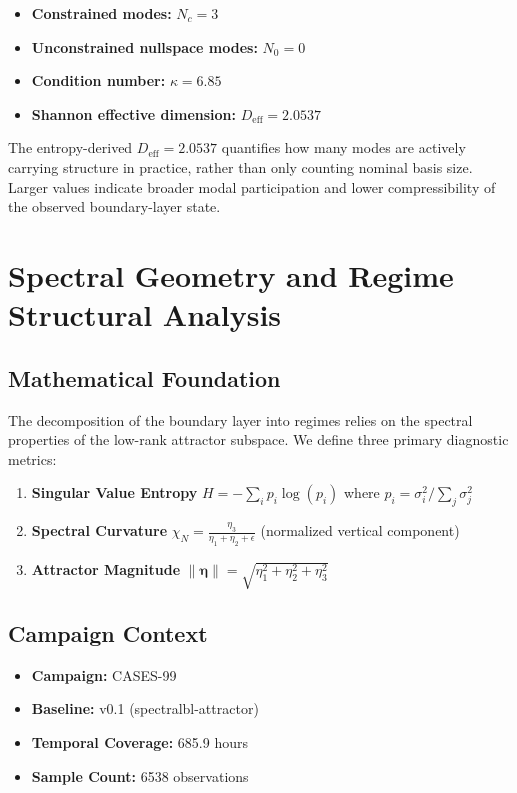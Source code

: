 \documentclass[11pt,a4paper]{article}
\begin{document}
\begin{itemize}
    \item \textbf{Constrained modes:} $N_c = 3$
    \item \textbf{Unconstrained nullspace modes:} $N_0 = 0$
    \item \textbf{Condition number:} $\kappa = 6.85$
    \item \textbf{Shannon effective dimension:} $D_{\text{eff}} = 2.0537$
\end{itemize}

The entropy-derived $D_{\text{eff}} = 2.0537$ quantifies how many modes are actively carrying structure in practice, rather than only counting nominal basis size. Larger values indicate broader modal participation and lower compressibility of the observed boundary-layer state.

\label{sec:attractor_CASES-99} 
\newpage



\section{Spectral Geometry and Regime Structural Analysis}

\subsection{Mathematical Foundation}

The decomposition of the boundary layer into regimes relies on the spectral properties of the low-rank attractor subspace. We define three primary diagnostic metrics:

\begin{enumerate}
    \item \textbf{Singular Value Entropy} $H = -\sum_i p_i \log(p_i)$ where $p_i = \sigma_i^2 / \sum_j \sigma_j^2$
    \item \textbf{Spectral Curvature} $\chi_N = \frac{\eta_3}{\eta_1 + \eta_2 + \epsilon}$ (normalized vertical component)
    \item \textbf{Attractor Magnitude} $\|\boldsymbol{\eta}\| = \sqrt{\eta_1^2 + \eta_2^2 + \eta_3^2}$
\end{enumerate}

\subsection{Campaign Context}

\begin{itemize}
    \item \textbf{Campaign:} CASES-99
    \item \textbf{Baseline:} v0.1 (spectralbl-attractor)
    \item \textbf{Temporal Coverage:} 685.9 hours
    \item \textbf{Sample Count:} 6538 observations
\end{itemize}
\end{document}
